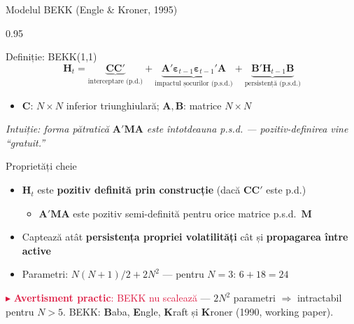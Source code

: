 \documentclass[9pt, aspectratio=169, t]{beamer}
\begin{document}
\begin{frame}{Modelul BEKK (Engle \& Kroner, 1995)}
    \begin{cminipage}{0.95\textwidth}
    \vspace{-2mm}
    {\scriptsize
    \begin{block}{Definiție: BEKK(1,1)}
        \[
            \mathbf{H}_t = \underbrace{\mathbf{C}\mathbf{C}'}_{\text{interceptare (p.d.)}} + \underbrace{\mathbf{A}'\boldsymbol{\varepsilon}_{t-1}\boldsymbol{\varepsilon}_{t-1}'\mathbf{A}}_{\text{impactul șocurilor (p.s.d.)}} + \underbrace{\mathbf{B}'\mathbf{H}_{t-1}\mathbf{B}}_{\text{persistență (p.s.d.)}}
        \]
        \begin{itemize}\setlength{\itemsep}{0pt}
            \item $\mathbf{C}$: $N \times N$ inferior triunghiulară; $\mathbf{A}, \mathbf{B}$: matrice $N \times N$
        \end{itemize}
        \textit{Intuiție: forma pătratică $\mathbf{A}'\mathbf{M}\mathbf{A}$ este întotdeauna p.s.d. --- pozitiv-definirea vine ``gratuit.''}
    \end{block}
    \vspace{-1mm}
    \begin{block}{Proprietăți cheie}
        \begin{itemize}\setlength{\itemsep}{0pt}
            \item $\mathbf{H}_t$ este \textbf{pozitiv definită prin construcție} (dacă $\mathbf{C}\mathbf{C}'$ este p.d.)
                \begin{itemize}\setlength{\itemsep}{0pt}
                    \item $\mathbf{A}'\mathbf{M}\mathbf{A}$ este pozitiv semi-definită pentru orice matrice p.s.d.\ $\mathbf{M}$
                \end{itemize}
            \item Captează atât \textbf{persistența propriei volatilități} cât și \textbf{propagarea între active}
            \item Parametri: $N(N+1)/2 + 2N^2$ --- pentru $N=3$: $6 + 18 = 24$
        \end{itemize}
    \end{block}
    \vspace{-1mm}
    \textcolor{Crimson}{$\blacktriangleright$ \textbf{Avertisment practic}: BEKK nu scalează} --- $2N^2$ parametri $\Rightarrow$ intractabil pentru $N > 5$.
    BEKK: \textbf{B}aba, \textbf{E}ngle, \textbf{K}raft și \textbf{K}roner (1990, working paper).
    }
    \end{cminipage}
\end{frame}
\end{document}
